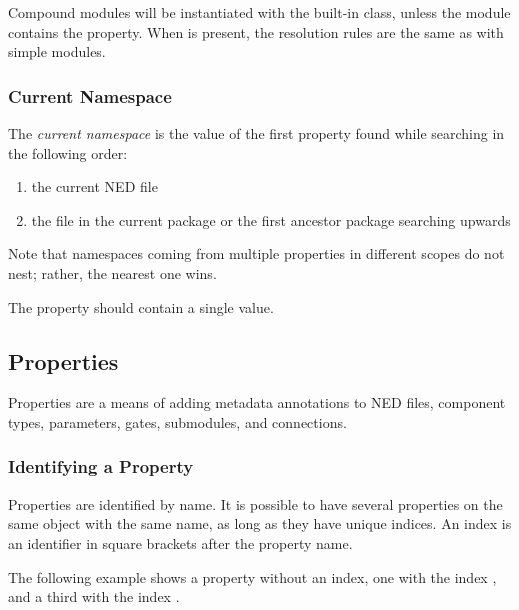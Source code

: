 Compound modules will be instantiated with the built-in  class,
unless the module contains the  property. When  is present,
the resolution rules are the same as with simple modules.


\subsubsection{Current Namespace}
\label{ch:ned-ref:current-namespace}

The \textit{current namespace} is the value of the first 
property found while searching in the following order:

\begin{enumerate}
  \item the current NED file
  \item the  file in the current package or the first ancestor
        package searching upwards
\end{enumerate}

\begin{note}
    Note that namespaces coming from multiple  properties
    in different scopes do not nest; rather, the nearest one wins.
\end{note}

The  property should contain a single value.



\subsection{Properties}
\label{sec:ned-ref:properties}

Properties are a means of adding metadata annotations to NED files, component types,
parameters, gates, submodules, and connections.

\subsubsection{Identifying a Property}
\label{sec:ned-ref:identifying-a-property}

Properties are identified by name. It is possible to have several properties
on the same object with the same name, as long as they have unique indices.
An index is an identifier in square brackets after the property name.

The following example shows a property without an index, one with the index ,
and a third with the index .


